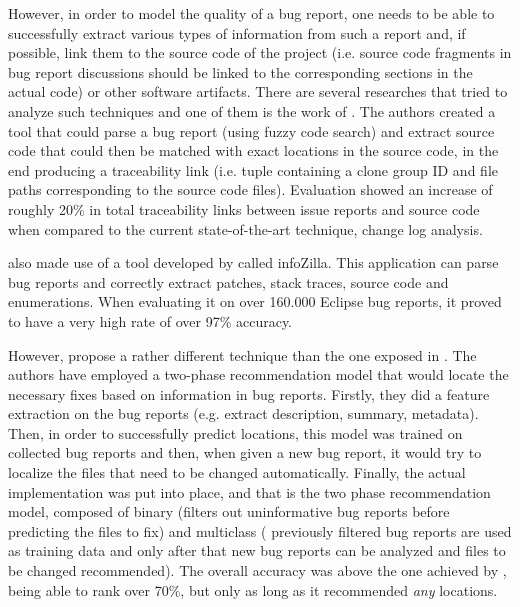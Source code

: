 \documentclass{mprop}
\begin{document}
However, in order to model the quality of a bug report, one needs to be able to
successfully extract various types of information from such a report and, if 
possible, link them to the source code of the project (i.e. source code fragments
in bug report discussions should be linked to the corresponding sections in the 
actual code) or other software artifacts. There are several researches that tried 
to analyze such techniques and one of them is the work of 
\citet{bettenburg2012using}. The authors created a tool that could parse a bug 
report (using fuzzy code search) and extract source code that could then be
matched with exact locations in the source code, in the end producing a 
traceability link (i.e. tuple containing a clone group ID and file paths 
corresponding to the source code files). Evaluation showed an increase of
roughly 20\% in total traceability links between issue reports and source code 
when compared to the current state-of-the-art technique, change log analysis.

\citet{bettenburg2012using} also made use of a tool developed by 
\citet{bettenburg2008extracting} called infoZilla. This application can
parse bug reports and correctly extract patches, stack traces, source code and
enumerations. When evaluating it on over 160.000 Eclipse bug reports, it proved to 
have a very high rate of over 97\% accuracy.

However, \citet{kim2013should} propose a rather different technique than the one
exposed in \citet{bettenburg2012using}. The authors have employed a two-phase
recommendation model that would locate the necessary fixes based on information
in bug reports. Firstly, they did a feature extraction on the bug reports (e.g. 
extract description, summary, metadata). Then, in order to successfully predict
locations, this model was trained on collected bug reports and then, when given
a new bug report, it would try to localize the files that need to be changed 
automatically. Finally, the actual implementation was put into place, and that
is the two phase recommendation model, composed of binary (filters out 
uninformative bug reports before predicting the files to fix) and multiclass (
previously filtered bug reports are used as training data and only after that
new bug reports can be analyzed and files to be changed recommended). The 
overall accuracy was above the one achieved by \citet{bettenburg2012using}, 
being able to rank over 70\%, but only as long as it recommended \emph{any} 
locations.
\end{document}
